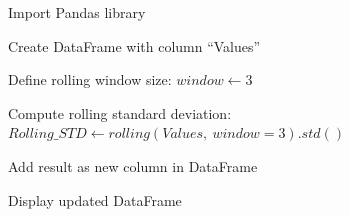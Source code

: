 \begin{algorithm}
\caption{Create a Rolling Window Standard Deviation Column in Pandas}
\begin{algorithmic}[1]

\STATE Import Pandas library

\STATE Create DataFrame with column ``Values''

\STATE Define rolling window size:
\STATE $window \gets 3$

\STATE Compute rolling standard deviation:
\STATE $Rolling\_STD \gets rolling(Values,\ window=3).std()$

\STATE Add result as new column in DataFrame

\STATE Display updated DataFrame

\end{algorithmic}
\end{algorithm}